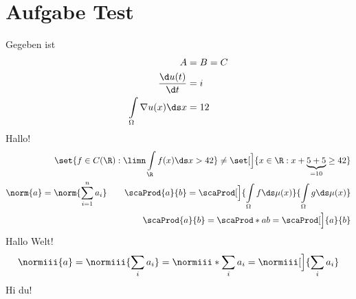 
\section{Aufgabe Test}
	Gegeben ist
	\begin{align*}
		A&=B=C\\
		\frac{\d u(t)}{\d t}&= i\\
		\int\limits_\Omega\nabla u(x)\ds x&=12
	\end{align*}
	Hallo! 
	\begin{align*}
		\set{f\in C(\R):\limn\int\limits_\R f(x)\ds x>42}\neq\set[\Big]{x\in\R:x+\underbrace{5+5}_{=10}\geq42}\\
		\norm{a}=\norm{\sum\limits_{i=1}^n a_i}\qquad
		\scaProd{a}{b}=\scaProd[\Big]{\int\limits_\Omega f\ds\mu(x)}{\int\limits_\Omega g\ds\mu(x)}\\
		\scaProd{a}{b}=\scaProd*{a}{b}=\scaProd[\Big]{a}{b}
	\end{align*}
	\newpage
	Hallo Welt! 
	\begin{align*}
		\normiii{a}
		=\normiii{\sum\limits_i a_i}
		=\normiii*{\sum\limits_i a_i}
		=\normiii[\Big]{\sum\limits_i a_i}
	\end{align*}
	\newpage
	Hi  du!